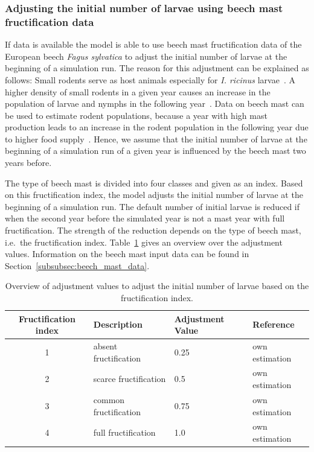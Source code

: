 \documentclass[a4paper, 11pt]{scrartcl}
\begin{document}
\subsubsection{Adjusting the initial number of larvae using beech mast fructification data}\label{subsubsec:initial_larvae_with_beech_mast}
If data is available the model is able to use beech mast fructification data of the European beech \textit{Fagus sylvatica} to adjust the initial number of larvae at the beginning of a simulation run. The reason for this adjustment can be explained as follows: Small rodents serve as host animals especially for \textit{I. ricinus} larvae~\parencite{Cayol.2017}. A higher density of small rodents in a given year causes an increase in the population of larvae and nymphs in the following year~\parencite{Brugger.2018}. Data on beech mast can be used to estimate rodent populations, because a year with high mast production leads to an increase in the rodent population in the following year due to higher food supply~\parencite{Clement.2009}. Hence, we assume that the initial number of larvae at the beginning of a simulation run of a given year is influenced by the beech mast two years before.

The type of beech mast is divided into four classes and given as an index. Based on this fructification index, the model adjusts the initial number of larvae at the beginning of a simulation run. The default number of initial larvae is reduced if when the second year before the simulated year is not a mast year with full fructification. The strength of the reduction depends on the type of beech mast, i.e.\ the fructification index. Table~\ref{tab:fructification_adjustment} gives an overview over the adjustment values. Information on the beech mast input data can be found in Section~\ref{subsubsec:beech_mast_data}.

\begin{table}[h!]
\caption[Overview of beech fructification adjustment values for model initialisation.]{Overview of adjustment values to adjust the initial number of larvae based on the fructification index.}
\label{tab:fructification_adjustment}
\begin{tabularx}{\textwidth}{clll}
\toprule
\textbf{Fructification index} & \textbf{Description}    & \textbf{Adjustment Value} & \textbf{Reference} \\
\midrule
1				 	  		  & absent fructification 	& 	0.25 & own estimation \\
2 				 	  		  & scarce fructification	&	0.5	& own estimation  \\
3 					  		  & common fructification	& 	0.75 & own estimation \\
4					 		  & full fructification 	& 	1.0	& own estimation \\
\bottomrule
\end{tabularx}
\end{table}
\end{document}

